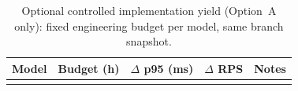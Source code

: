 \begin{table}[t]
\centering
\caption{Optional controlled implementation yield (Option~A only): fixed engineering budget per model, same branch snapshot.}
\label{tab:llm-implementation-yield}
\begin{tabular}{l c c c c}
\hline
Model & Budget (h) & $\Delta$ p95 (ms) & $\Delta$ RPS & Notes \\
\hline
 &  &  &  &  \\
\hline
\end{tabular}
\end{table}

